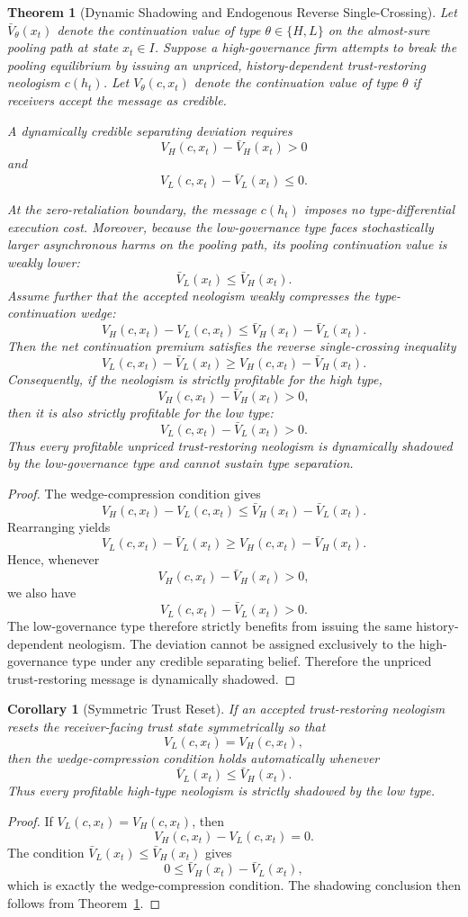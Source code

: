 \documentclass[preprint,authoryear]{elsarticle}
\newtheorem{theorem}{Theorem}
\newtheorem{corollary}{Corollary}
\theoremstyle{definition}
\theoremstyle{plain}
\begin{document}
\begin{theorem}[Dynamic Shadowing and Endogenous Reverse Single-Crossing]
\label{thm:dynamic-shadowing}
Let $\bar{V}_\theta(x_t)$ denote the continuation value of type
$\theta\in\{H,L\}$ on the almost-sure pooling path at state $x_t\in I$.
Suppose a high-governance firm attempts to break the pooling equilibrium by
issuing an unpriced, history-dependent trust-restoring neologism $c(h_t)$.
Let $V_\theta(c,x_t)$ denote the continuation value of type $\theta$ if
receivers accept the message as credible.

A dynamically credible separating deviation requires
\[
V_H(c,x_t)-\bar{V}_H(x_t)>0
\]
and
\[
V_L(c,x_t)-\bar{V}_L(x_t)\le 0.
\]

At the zero-retaliation boundary, the message $c(h_t)$ imposes no
type-differential execution cost.  Moreover, because the low-governance type
faces stochastically larger asynchronous harms on the pooling path, its
pooling continuation value is weakly lower:
\[
\bar{V}_L(x_t)\le \bar{V}_H(x_t).
\]
Assume further that the accepted neologism weakly compresses the
type-continuation wedge:
\[
V_H(c,x_t)-V_L(c,x_t)
\le
\bar{V}_H(x_t)-\bar{V}_L(x_t).
\]
Then the net continuation premium satisfies the reverse single-crossing
inequality
\[
V_L(c,x_t)-\bar{V}_L(x_t)
\ge
V_H(c,x_t)-\bar{V}_H(x_t).
\]
Consequently, if the neologism is strictly profitable for the high type,
\[
V_H(c,x_t)-\bar{V}_H(x_t)>0,
\]
then it is also strictly profitable for the low type:
\[
V_L(c,x_t)-\bar{V}_L(x_t)>0.
\]
Thus every profitable unpriced trust-restoring neologism is dynamically
shadowed by the low-governance type and cannot sustain type separation.
\end{theorem}
\begin{proof}
The wedge-compression condition gives
\[
V_H(c,x_t)-V_L(c,x_t)
\le
\bar{V}_H(x_t)-\bar{V}_L(x_t).
\]
Rearranging yields
\[
V_L(c,x_t)-\bar{V}_L(x_t)
\ge
V_H(c,x_t)-\bar{V}_H(x_t).
\]
Hence, whenever
\[
V_H(c,x_t)-\bar{V}_H(x_t)>0,
\]
we also have
\[
V_L(c,x_t)-\bar{V}_L(x_t)>0.
\]
The low-governance type therefore strictly benefits from issuing the same
history-dependent neologism. The deviation cannot be assigned exclusively to
the high-governance type under any credible separating belief. Therefore the
unpriced trust-restoring message is dynamically shadowed.
\end{proof}

\begin{corollary}[Symmetric Trust Reset]
\label{cor:symmetric-trust-reset}
If an accepted trust-restoring neologism resets the receiver-facing trust state
symmetrically so that
\[
V_L(c,x_t)=V_H(c,x_t),
\]
then the wedge-compression condition holds automatically whenever
\[
\bar{V}_L(x_t)\le \bar{V}_H(x_t).
\]
Thus every profitable high-type neologism is strictly shadowed by the low type.
\end{corollary}
\begin{proof}
If $V_L(c,x_t)=V_H(c,x_t)$, then
\[
V_H(c,x_t)-V_L(c,x_t)=0.
\]
The condition $\bar{V}_L(x_t)\le \bar{V}_H(x_t)$ gives
\[
0\le \bar{V}_H(x_t)-\bar{V}_L(x_t),
\]
which is exactly the wedge-compression condition.  The shadowing conclusion
then follows from Theorem~\ref{thm:dynamic-shadowing}.
\end{proof}
\end{document}
